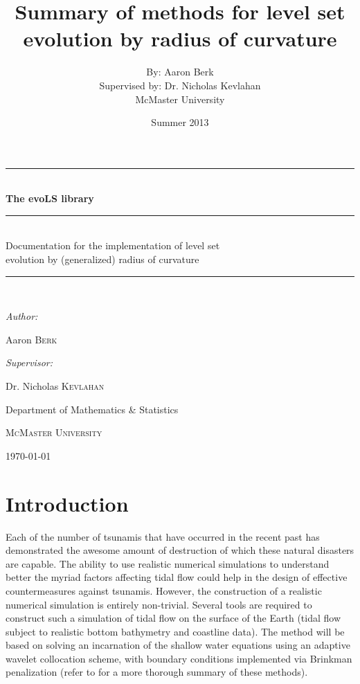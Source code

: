 \documentclass{article}
\title{Summary of methods for level set evolution by radius
  of curvature}
\author{By: Aaron Berk\\Supervised by: Dr. Nicholas
  Kevlahan\\McMaster University}
\date{Summer 2013}
\begin{document}

\begin{titlepage}
\phantom{asdf.}

\vskip100pt
  \begin{center}
\rule{.85\textwidth}{1pt}\\[0.2in]
    {\huge \bfseries The evoLS library}\\[0.1in]
\rule{.6\textwidth}{.5pt}\\[0.1in]
    {\LARGE Documentation for the implementation of level set\\
      evolution by (generalized) radius of curvature}\\[0.1in]
\rule{.85\textwidth}{1pt}\\[1in]
\begin{minipage}{0.4\textwidth}
  \begin{flushleft}\large
    \emph{Author:}

Aaron \textsc{Berk}
  \end{flushleft}
\end{minipage}
\begin{minipage}{0.4\textwidth}
  \begin{flushright}\large
    \emph{Supervisor:}

Dr. Nicholas \textsc{Kevlahan}
  \end{flushright}
\end{minipage}

\vfill

\begin{minipage}{0.5\textwidth}
  \begin{center}\large
    Department of Mathematics \& Statistics

\textsc{McMaster University}
  \end{center}
\end{minipage}

\vfill
{\large \today}
  \end{center}
\end{titlepage}


\section{Introduction}
\label{sec:introduction}

Each of the number of tsunamis that have occurred in the recent
past has demonstrated the awesome amount of destruction of which
these natural disasters are capable. The ability to use realistic
numerical simulations to understand better the myriad factors
affecting tidal flow could help in the design of effective
countermeasures against tsunamis. However, the construction of a
realistic numerical simulation is entirely non-trivial. Several
tools are required to construct such a simulation of tidal flow on
the surface of the Earth (\ie tidal flow subject to realistic
bottom bathymetry and coastline data). The method will be based on
solving an incarnation of the shallow water equations using an
adaptive wavelet collocation scheme, with boundary conditions
implemented via Brinkman penalization (refer to \cite{reckinger}
for a more thorough summary of these methods).
\end{document}
